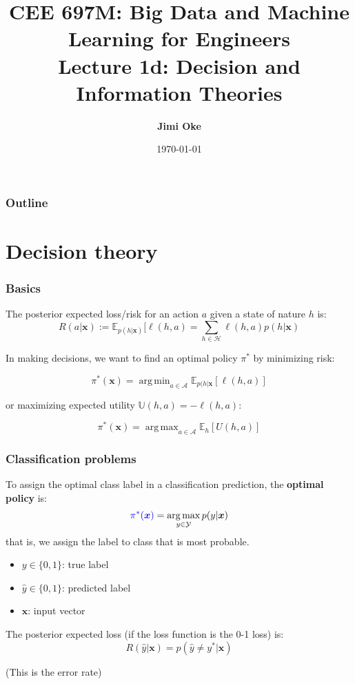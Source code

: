 \documentclass[smaller]{beamer}
\title[CEE 697M 1d: Decision \& Information Theories]{ {\normalsize CEE 697M:  Big Data  and Machine Learning for Engineers}
  \\ Lecture 1d: Decision and Information Theories}
\date[\today]{\footnotesize \today}
\author{{\bf Jimi Oke}}
\institute[UMass Amherst]{
  \begin{tikzpicture}[baseline=(current bounding box.center)]
    \node[anchor=base] at (-7,0) (its) {\texttt{[image: UMassEngineering\_vert]}} ;
  \end{tikzpicture}
}
\DeclareMathOperator*{\argmax}{arg\,max}
\DeclareMathOperator*{\argmin}{arg\,min}
\newcommand{\?}{\stackrel{?}{=}}
\newcommand{\bl}{\color{blue}}
\newcommand{\expe}{\mathbb{E}}
\newcommand{\mb}{\mathbb}
\begin{document}
\maketitle

\begin{frame}
  \frametitle{Outline}
  \tableofcontents
\end{frame}


\section{Decision theory}
\begin{frame}
  \frametitle{Basics}
  
  The posterior expected loss/risk for an action $a$ given a state of nature $h$ is:
  \pause
  \begin{equation}
    R(a|\bm x) := \expe_{p(h|\bm x)}[\ell(h,a) = \sum_{h\in\mathcal{H}}\ell(h,a)p(h|\bm x)
  \end{equation}

  
  \pause
  In making decisions, we want to find an optimal policy $\pi^*$ by minimizing risk:
  \pause

  \begin{equation}
    \pi^*(\bm x) = \argmin_{a\in\mathcal{A}}\expe_{p(h|\bm x}[\ell(h,a)]
  \end{equation}

  \pause

  or maximizing expected utility $\mb U(h,a) = -\ell(h,a)$:

    \begin{equation}
    \pi^*(\bm x) = \argmax_{a\in\mathcal{A}}\expe_{h}[U(h,a)]
  \end{equation}
  
\end{frame}
 
 

\begin{frame}
  \frametitle{Classification problems}
  \pause
  To assign the optimal class label in a classification prediction, the \textbf{\bl optimal policy} is:
  \pause
  \begin{equation}
    {\bl \pi^*(\bm x)} = \argmax_{y\in \mathcal{Y}}p(y|\bm x)
  \end{equation}
  \pause
  that is, we assign the label to class that is most probable.

  \pause
  \begin{itemize}
  \item $y\in \{0,1\}$: true label
  \item $\hat y \in \{0,1\}$: predicted label
  \item $\bm x$: input vector
  \end{itemize}
  \pause
  \bigskip

  The posterior expected loss (if the loss function is the 0-1 loss) is: \pause
  \begin{equation}
    R(\hat y|\bm x) = p(\hat y \ne y^*|\bm x)
  \end{equation}

  \pause
  (This is the error rate)
\end{frame}
\end{document}
